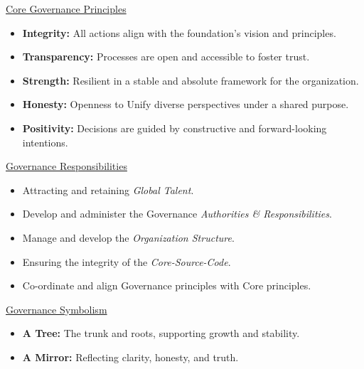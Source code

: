 \documentclass[twocolumn,10pt]{article}
\begin{document}
\vspace{20pt}
\begin{minipage}{0.95\linewidth}
    \begin{tcolorbox}
        \begin{center}\underline{Core Governance Principles}\end{center}
        \begin{itemize}
            \item \textbf{Integrity:} All actions align with the foundation's vision and principles.
            \item \textbf{Transparency:} Processes are open and accessible to foster trust.
            \item \textbf{Strength:} Resilient in a stable and absolute framework for the organization.
            \item \textbf{Honesty:} Openness to Unify diverse perspectives under a shared purpose.
            \item \textbf{Positivity:} Decisions are guided by constructive and forward-looking intentions.
        \end{itemize}

        \begin{center}\underline{Governance Responsibilities}\end{center}
        \begin{itemize}
            \item Attracting and retaining \textit{Global Talent}.
            \item Develop and administer the Governance \textit{Authorities \& Responsibilities}.
            \item Manage and develop the \textit{Organization Structure}.
            \item Ensuring the integrity of the \textit{Core-Source-Code}.
            \item Co-ordinate and align Governance principles with Core principles.
        \end{itemize}

        \begin{center}\underline{Governance Symbolism}\end{center}
        \begin{itemize}
            \item \textbf{A Tree:} The trunk and roots, supporting growth and stability.
            \item \textbf{A Mirror:} Reflecting clarity, honesty, and truth.
        \end{itemize}
    \end{tcolorbox}
\end{minipage}
\end{document}
